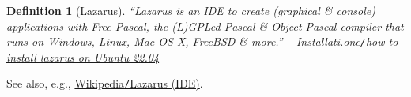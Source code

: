 \documentclass[oneside]{book}
\numberwithin{equation}{section}
\newtheorem{definition}{Definition}[section]
\begin{document}
\begin{definition}[Lazarus]
	``\emph{Lazarus} is an IDE to create (graphical \& console) applications with Free Pascal, the (L)GPLed Pascal \& Object Pascal compiler that runs on Windows, Linux, Mac OS X, FreeBSD \& more.'' -- \href{https://installati.one/ubuntu/22.04/lazarus/}{Installati.one\emph{\texttt{/}}how to install lazarus on Ubuntu 22.04}
\end{definition}
See also, e.g., \href{https://vi.wikipedia.org/wiki/Lazarus_(IDE)}{Wikipedia\texttt{/}Lazarus (IDE)}.


\printbibliography[heading=bibintoc]
	
\end{document}
